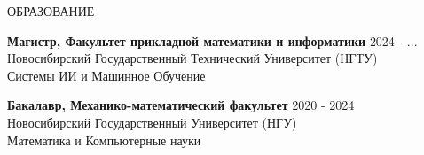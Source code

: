 \documentclass{resume} %
\begin{document}
\begin{rSection}{ОБРАЗОВАНИЕ} %

{\bf Магистр, Факультет прикладной математики и информатики} \hfill {2024 - ...} \\
Новосибирский Государственный Технический Университет (НГТУ) \\ %
Системы ИИ и Машинное Обучение

{\bf Бакалавр, Механико-математический факультет} \hfill {2020 - 2024} \\
Новосибирский Государственный Университет (НГУ) \\ %
Математика и Компьютерные науки %

\end{rSection}

\begin{rSection}
{}
\end{rSection}
\end{document}

